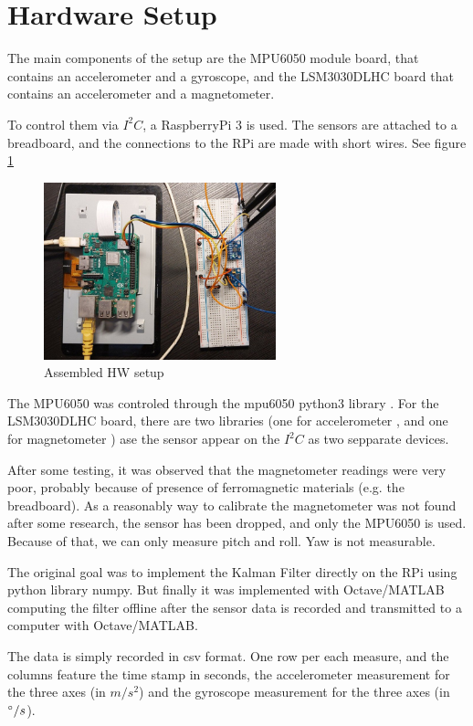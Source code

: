 \section{Hardware Setup}
The main components of the setup are the MPU6050 module board, that contains an accelerometer and a gyroscope, and the LSM3030DLHC board that contains an accelerometer and a magnetometer.

To control them via $I^2C$, a RaspberryPi 3 is used. The sensors are attached to a breadboard, and the connections to the RPi are made with short wires. See figure \ref{fig:setup}

\begin{figure}[h]
\centering
\includegraphics[width=0.6\textwidth]{figures/setup.jpeg}
\caption{Assembled HW setup}
\label{fig:setup}
\end{figure}

The MPU6050 was controled through the mpu6050 python3 library \cite{mpu_repo}. For the LSM3030DLHC board, there are two libraries (one for accelerometer \cite{acc_repo}, and one for magnetometer \cite{magn_repo}) ase the sensor appear on the $I^2C$ as two sepparate devices.

After some testing, it was observed that the magnetometer readings were very poor, probably because of presence of ferromagnetic materials (e.g. the breadboard). As a reasonably way to calibrate the magnetometer was not found after some research, the sensor has been dropped, and only the MPU6050 is used. Because of that, we can only measure pitch and roll. Yaw is not measurable.

The original goal was to implement the Kalman Filter directly on the RPi using python library numpy. But finally it was implemented with Octave/MATLAB computing the filter offline after the sensor data is recorded and transmitted to a computer with Octave/MATLAB.

The data is simply recorded in csv format. One row per each measure, and the columns feature the time stamp in seconds, the accelerometer measurement for the three axes (in $m/s^2$) and the gyroscope measurement for the three axes (in $\degree / s$).